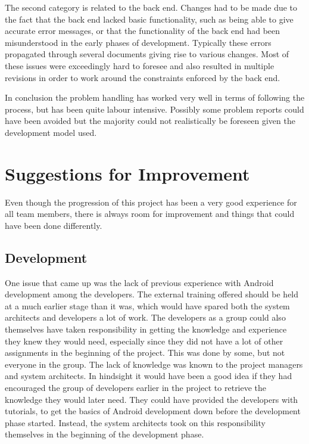\documentclass[a4paper]{article}
\begin{document}
The second category is related to the back end. Changes had to be made due to the fact that the back end lacked basic functionality, such as being able to give accurate error messages, or that the functionality of the back end had been misunderstood in the early phases of development. Typically these errors propagated through several documents giving rise to various changes. Most of these issues were exceedingly hard to foresee and also resulted in multiple revisions in order to work around the constraints enforced by the back end.

In conclusion the problem handling has worked very well in terms of following the process, but has been quite labour intensive. Possibly some problem reports could have been avoided but the majority could not realistically be foreseen given the development model used. 

\section{Suggestions for Improvement}
\label{sec:impr}

Even though the progression of this project has been a very good experience for all team members, there is always room for improvement and things that could have been done differently. 

\subsection{Development}
One issue that came up was the lack of previous experience with Android development among the developers. The external training offered should be held at a much earlier stage than it was, which would have spared both the system architects and developers a lot of work. The developers as a group could also themselves have taken responsibility in getting the knowledge and experience they knew they would need, especially since they did not have a lot of other assignments in the beginning of the project. This was done by some, but not everyone in the group. The lack of knowledge was known to the project managers and system architects. In hindsight it would have been a good idea if they had encouraged the group of developers earlier in the project to retrieve the knowledge they would later need. They could have provided the developers with tutorials, to get the basics of Android development down before the development phase started. Instead, the system architects took on this responsibility themselves in the beginning of the development phase. 
\end{document}
